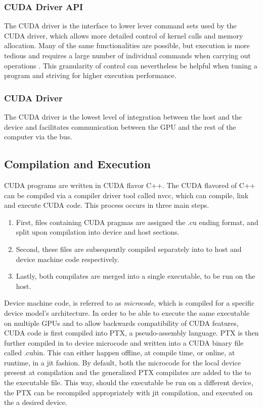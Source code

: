 \subsubsection{CUDA Driver API}
The CUDA driver is the interface to lower lever command sets used by the CUDA driver, which allows more detailed control
of kernel calls and memory allocation. Many of the same functionalities are possible,
but execution is more tedious and requires a large number of individual commands
when carrying out operations \cite{driver}. This granularity of control can nevertheless be
helpful when tuning a program and striving for higher execution performance.
\subsubsection{CUDA Driver}

The CUDA driver is the lowest level of integration between the host and the device
and facilitates communication between the \Gls{GPU} and the rest of the computer via the bus.


\subsection{Compilation and Execution}


CUDA programs are written in CUDA flavor C++.  The CUDA flavored of C++
can be compiled via a compiler driver tool called nvcc, which can compile, link and execute CUDA code.  This process occurs
 in three main steps.
 \begin{enumerate}

\item First,
files containing CUDA pragmas are assigned the .cu ending format, and split upon
compilation into device and host sections.
\item Second, these files are subsequently
compiled separately into to host and device machine code respectively.
\item Lastly, both compilates are merged into a single executable, to be run on the host.
\end{enumerate}
\par
Device machine code, is referred to as  \textit{microcode},
which is compiled for a specific device model's architecture. In order to be able
to execute the same executable
on multiple \Glspl{GPU} and to allow backwards compatibility of CUDA features, CUDA code is
first compiled into \Gls{PTX}, a pseudo-assembly language.  \Gls{PTX} is then
further compiled in to device microcode and written into a CUDA binary file called .cubin.
This can either happen offline, at compile time,
or online, at runtime, in a \gls{jit} fashion.  By default, both
the microcode for the local device present at compilation and the generalized
\gls{PTX} compilates are added to the to the executable file.
This way, should the executable be run on a different device, the \gls{PTX} can
be recompiled appropriately with \Gls{jit} compilation, and executed on the a
desired device\cite{Wilt}.

